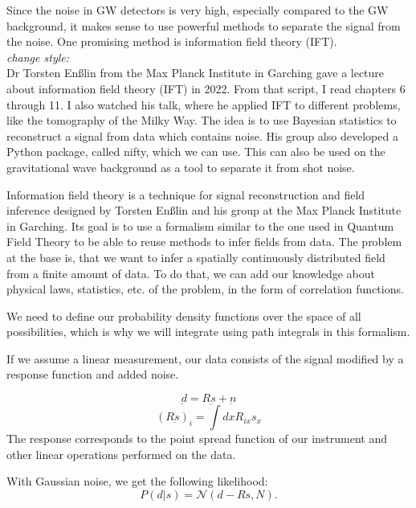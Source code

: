 Since the noise in GW detectors is very high, especially compared to the GW background, it makes sense to use powerful methods to separate the signal from the noise. One promising method is information field theory (IFT).
\\
\textit{change style:}
\\
Dr Torsten Enßlin from the Max Planck Institute in Garching gave a lecture about 
information field theory (IFT) in 2022. From that script, I read chapters 6 through 11. 
I also watched his talk, where he applied IFT to different problems, like the
tomography of the Milky Way.  The idea is to use Bayesian statistics to reconstruct 
a signal from data which contains noise. His group also developed a Python package, 
called nifty, which we can use. This can also be used on the gravitational wave 
background as a tool to separate it from shot noise.


Information field theory is a technique for signal reconstruction
and field inference designed by Torsten Enßlin and his group at the 
Max Planck Institute in Garching.
Its goal is to use a formalism similar to the one used in Quantum Field
Theory to be able to reuse methods to infer fields from data. The problem
at the base is, that we want to infer a spatially continuously distributed field
from a finite amount of data. To do that, we can add our knowledge about 
physical laws, statistics, etc. of the problem, in the form of correlation functions.

We need to define our probability density functions over the space of all
possibilities, which is why we will integrate using path integrals in 
this formalism.

If we assume a linear measurement, our data consists of the signal modified by a response function and added noise.

\begin{equation}
    \underbar{d} = R\underbar{s} +\underbar{n}
\end{equation}
\begin{equation}
    (R\underbar{s})_i = \int dx R_{ix} s_{x}
\end{equation}
The response corresponds to the point spread function of our instrument and
other linear operations performed on the data.

With Gaussian noise, we get the following likelihood:
\begin{equation}
    P(d|s) = \mathcal{N}(d-Rs, N) .
\end{equation}

